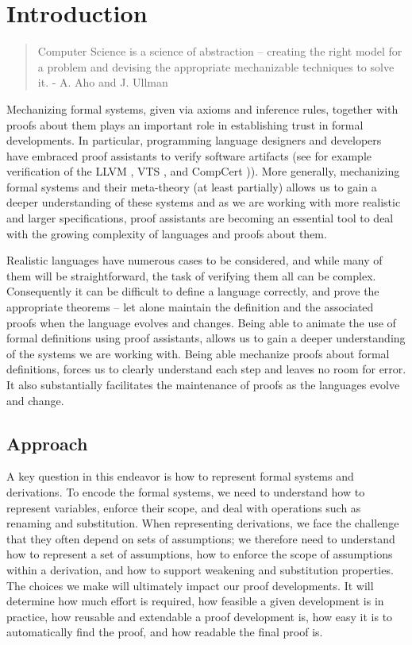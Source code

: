\chapter{Introduction}
\begin{center}
  \begin{quote}
Computer Science is a science of abstraction --
creating the right model for a problem and
devising the appropriate mechanizable techniques
to solve it.
\hfill- A. Aho and J. Ullman
  \end{quote}
\end{center}

Mechanizing formal systems, given via axioms and inference rules,
together with proofs about them plays an important role in
establishing trust in formal developments. In particular, programming
language designers and developers have embraced proof assistants to
verify software artifacts (see for example verification of the LLVM
\citep{ZhaoNMZ12}, VTS \citep{Appel11}, and CompCert
\citep{Leroy-Compcert-CACM})). More generally, mechanizing formal
systems and their meta-theory (at least partially) allows us to gain a
deeper understanding of these systems and as we are working with more
realistic and larger specifications, proof assistants are becoming an
essential tool to deal with the growing complexity of languages and
proofs about them. %

Realistic languages have numerous cases to be considered, and
while many of them will be straightforward, the task of verifying them
all can be complex. Consequently it can be difficult to define a language
correctly, and prove the appropriate theorems -- let alone maintain
the definition and the associated proofs when the language evolves and
changes.  Being able to animate the use of formal definitions using
proof assistants, allows us to gain a deeper understanding of the
systems we are working with. Being able mechanize proofs about formal
definitions, forces us to clearly understand each step and leaves no
room for error.  It also substantially facilitates the maintenance of
proofs as the languages evolve and change.


\section{Approach}

A key question in this endeavor is how to represent formal systems and
derivations. To encode the formal systems, we need to understand how
to represent variables, enforce their scope, and deal with operations
such as renaming and substitution. When representing derivations, we
face the challenge that they often depend on sets of assumptions; we
therefore need to understand how to represent a set of assumptions,
how to enforce the scope of assumptions within a derivation, and how
to support weakening and substitution properties. The choices we make
will ultimately  impact our proof developments. It will determine
how much effort is required, how feasible a given development is in
practice, how reusable and extendable a proof development is, how easy
it is to automatically find the proof, and how readable the final proof is.

